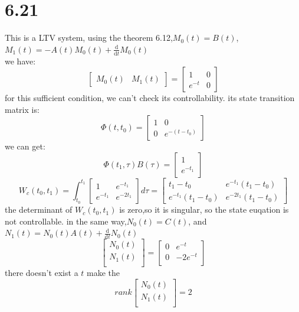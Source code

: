 \documentclass{article}
\begin{document}
\section*{6.21}
This is a LTV system,
using the theorem 6.12,$M_0(t)=B(t)$,$M_1(t)=-A(t)M_0(t)+\frac{\mathrm{d}}{\mathrm{d}t}M_0(t)$\\
we have:
\[
\left[
    \begin{array}{cc}
    M_0(t) & M_1(t)        
    \end{array}
\right]=
\left[
    \begin{array}{cc}
    1 & 0\\
    e^{-t} & 0
    \end{array}
\right] 
\]
for this sufficient condition, we can't check its controllability.
its state transition matrix is:
\[
\Phi(t,t_0)=
\left[
    \begin{array}{cc}
        1 & 0\\
        0 & e^{-(t-t_0)}
    \end{array}
\right]    
\]
we can get:
\[
\Phi(t_1,\tau)B(\tau)=
\left[
    \begin{array}{c}
        1\\
        e^{-t_1}
    \end{array}
\right]    
\]
\[
W_c(t_0,t_1)=
\int_{t_0}^{t_1}
\left[
    \begin{array}{cc}
        1 & e^{-t_1}\\
        e^{-t_1} & e^{-2t_1}
    \end{array}
\right]d\tau
=\left[
    \begin{array}{cc}
        t_1-t_0 & e^{-t_1}(t_1-t_0)\\
        e^{-t_1}(t_1-t_0) & e^{-2t_1}(t_1-t_0)
    \end{array}
\right]
\]
the determinant of $W_c(t_0,t_1)$ is zero,so it is singular, so the state euqation is not controllable.
in the same way,$N_0(t)=C(t)$, and $N_1(t)=N_0(t)A(t)+\frac{\mathrm{d}}{\mathrm{d}t}N_0(t)$
\[
\left[
    \begin{array}{c}
    N_0(t)\\
    N_1(t)\\      
    \end{array}
\right]=
\left[
    \begin{array}{cc}
    0 & e^{-t}\\
    0 & -2e^{-t} \\
    \end{array}
\right] 
\]
there doesn't exist a $t$ make the 
\[
rank
\left[
    \begin{array}{c}
    N_0(t)\\
    N_1(t)\\      
    \end{array}
\right]=2
\]
\end{document}
